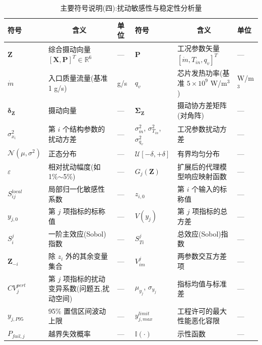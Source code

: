 \begin{table}[H]
\centering
\small
\setlength{\tabcolsep}{2.5pt}
\caption{主要符号说明(四):扰动敏感性与稳定性分析量}
\begin{tabular}{>{\centering\arraybackslash}p{1.4cm}p{4.6cm}>{\centering\arraybackslash}p{1.2cm}>{\centering\arraybackslash}p{1.4cm}p{4.6cm}>{\centering\arraybackslash}p{1.2cm}}
\toprule
符号 & \multicolumn{1}{c}{含义} & 单位 & 符号 & \multicolumn{1}{c}{含义} & 单位 \\
\midrule
$\mathbf{Z}$    & 综合摄动向量 $[\mathbf{X}, \mathbf{P}]^T \in \mathbb{R}^6$ & — & $\mathbf{P}$ & 工况参数矢量 $[\dot{m}, T_{in}, q_v]^T$ & — \\
$\dot{m}$       & 入口质量流量(基准 1 g/s) & g/s & $q_v$        & 芯片发热功率(基准 $5\times10^9$ W/m$^3$) & W/m$^3$ \\
$\boldsymbol{\delta}_{\mathbf{Z}}$ & 摄动向量 & — & $\boldsymbol{\Sigma}_{\mathbf{Z}}$ & 摄动协方差矩阵(对角阵) & — \\
$\sigma_{x_i}^2$  & 第 $i$ 个结构参数的扰动方差 & — & $\sigma_{\dot{m}}^2$, $\sigma_{T_{in}}^2$, $\sigma_{q_v}^2$ & 工况参数扰动方差 & — \\
$\mathcal{N}(\mu, \sigma^2)$ & 正态分布 & — & $\mathcal{U}[-\delta, +\delta]$ & 有界均匀分布 & — \\
$\varepsilon$   & 相对扰动幅度(如 1\%$\sim$5\%) & — & $G_j(\mathbf{Z})$ & 扩展后的代理模型响应映射函数 & — \\
$S_{ij}^{local}$ & 局部归一化敏感性系数 & — & $z_{i,0}$     & 第 $i$ 个输入的标称值 & — \\
$y_{j,0}$       & 第 $j$ 项指标的标称值 & — & $V(y_j)$      & 第 $j$ 项指标的总方差 & — \\
$S_i^j$         & 一阶主效应(Sobol)指数 & — & $S_{Ti}^j$    & 总效应(Sobol)指数 & — \\
$\mathbf{Z}_{-i}$ & 除 $z_i$ 外的其余变量集合 & — & $V_{im}^j$    & 两参数交互方差项 & — \\
$CV_j^{pert}$  & 第 $j$ 项指标的扰动变异系数(问题五,扰动空间) & — & $\mu_{y_j}$, $\sigma_{y_j}$ & 指标均值与标准差 & — \\
$y_{j, P95}$    & 95\% 置信区间波动上限 & — & $y_{j, max}^{limit}$ & 工程许可的最大性能恶化容限 & — \\
$P_{fail, j}$   & 越界失效概率 & — & $\mathbb{I}(\cdot)$ & 示性函数 & — \\
\bottomrule
\end{tabular}
\end{table}

